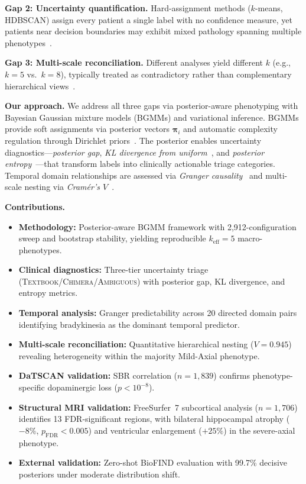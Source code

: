\documentclass[runningheads]{llncs}
\begin{document}
\textbf{Gap 2: Uncertainty quantification.} Hard-assignment methods ($k$-means, HDBSCAN) assign every patient a single label with no confidence measure, yet patients near decision boundaries may exhibit mixed pathology spanning multiple phenotypes~\cite{simuni2024biologicaldefinition}.

\textbf{Gap 3: Multi-scale reconciliation.} Different analyses yield different $k$ (e.g., $k{=}5$ vs.\ $k{=}8$), typically treated as contradictory rather than complementary hierarchical views~\cite{weingarten2022parkinsons}.

\textbf{Our approach.} We address all three gaps via posterior-aware phenotyping with Bayesian Gaussian mixture models (BGMMs) and variational inference. BGMMs provide soft assignments via posterior vectors $\boldsymbol{\pi}_i$ and automatic complexity regulation through Dirichlet priors~\cite{bishop2006pattern}. The posterior enables uncertainty diagnostics---\emph{posterior gap}, \emph{KL divergence from uniform}~\cite{bishop2006pattern}, and \emph{posterior entropy}~\cite{shannon1948mathematical}---that transform labels into clinically actionable triage categories. Temporal domain relationships are assessed via \emph{Granger causality}~\cite{granger1969investigating} and multi-scale nesting via \emph{Cram\'{e}r's $V$}~\cite{cramer1946mathematical}.



\noindent\textbf{Contributions.}
\begin{itemize}
\item \textbf{Methodology:} Posterior-aware BGMM framework with 2{,}912-configuration sweep and bootstrap stability, yielding reproducible $k_{\mathrm{eff}}{=}5$ macro-phenotypes.
\item \textbf{Clinical diagnostics:} Three-tier uncertainty triage (\textsc{Textbook}/\textsc{Chimera}/\textsc{Ambiguous}) with posterior gap, KL divergence, and entropy metrics.
\item \textbf{Temporal analysis:} Granger predictability across 20 directed domain pairs identifying bradykinesia as the dominant temporal predictor.
\item \textbf{Multi-scale reconciliation:} Quantitative hierarchical nesting ($V{=}0.945$) revealing heterogeneity within the majority Mild-Axial phenotype.
\item \textbf{DaTSCAN validation:} SBR correlation ($n{=}1{,}839$) confirms phenotype-specific dopaminergic loss ($p{<}10^{-8}$).
\item \textbf{Structural MRI validation:} FreeSurfer~7 subcortical analysis ($n{=}1{,}706$) identifies 13 FDR-significant regions, with bilateral hippocampal atrophy ($-8\%$, $p_{\mathrm{FDR}}{<}0.005$) and ventricular enlargement ($+25\%$) in the severe-axial phenotype.
\item \textbf{External validation:} Zero-shot BioFIND evaluation with 99.7\% decisive posteriors under moderate distribution shift.
\end{itemize}
\end{document}
